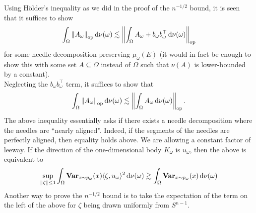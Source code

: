 \documentclass{article}
\begin{document}
		Using H\"{o}lder's inequality as we did in the proof of the $n^{-1/2}$ bound, it is seen that it suffices to show
		\[ \int_\Omega \left\lVert A_\omega\right\rVert_{\text{op}} \operatorname{d}\!{\nu(\omega)} \lesssim \left\lVert \int_\Omega A_\omega + b_\omega b_\omega^\top \operatorname{d}\!{\nu(\omega)} \right\rVert_{\text{op}} \]
		for some needle decomposition preserving $\mu_\omega(E)$ (it would in fact be enough to show this with some set $A\subseteq \Omega$ instead of $\Omega$ such that $\nu(A)$ is lower-bounded by a constant).\\
		Neglecting the $b_\omega b_\omega^\top$ term, it suffices to show that
		\begin{equation}
			\label{eqn: needle nearly aligned}
			\int_\Omega \left\lVert A_\omega\right\rVert_{\text{op}} \operatorname{d}\!{\nu(\omega)} \lesssim \left\lVert \int_\Omega A_\omega \operatorname{d}\!{\nu(\omega)} \right\rVert_{\text{op}}.
		\end{equation}
		The above inequality essentially asks if there exists a needle decomposition where the needles are ``nearly aligned''. Indeed, if the segments of the needles are perfectly aligned, then equality holds above. We are allowing a constant factor of leeway. If the direction of the one-dimensional body $K_\omega$ is $u_\omega$, then the above is equivalent to
		\begin{equation}
			\sup_{\norm{\zeta} \leq 1} \int_\Omega \Var_{x \sim p_\omega}(x) \langle \zeta , u_\omega \rangle^2 \dif \nu(\omega) \gtrsim \int_\Omega \Var_{x \sim p_\omega}(x) \dif \nu(\omega)	
		\end{equation}
		Another way to prove the $n^{-1/2}$ bound is to take the expectation of the term on the left of the above for $\zeta$ being drawn uniformly from $S^{n-1}$.



\end{document}
